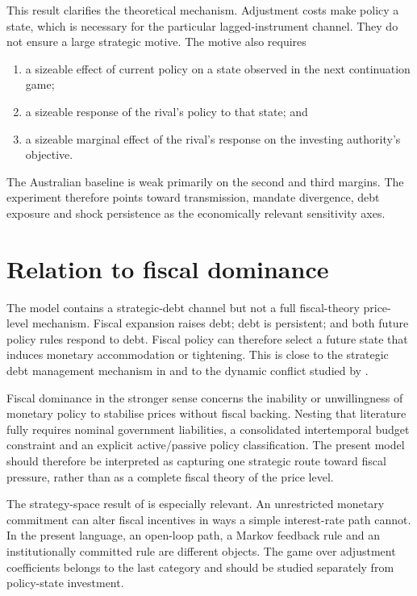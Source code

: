 \documentclass[11pt]{article}
\begin{document}
This result clarifies the theoretical mechanism.  Adjustment costs make policy
a state, which is necessary for the particular lagged-instrument channel.
They do not ensure a large strategic motive.  The motive also requires
\begin{enumerate}
 \item a sizeable effect of current policy on a state observed in the next
       continuation game;
 \item a sizeable response of the rival's policy to that state; and
 \item a sizeable marginal effect of the rival's response on the investing
       authority's objective.
\end{enumerate}
The Australian baseline is weak primarily on the second and third margins.
The experiment therefore points toward transmission, mandate divergence, debt
exposure and shock persistence as the economically relevant sensitivity axes.

\section{Relation to fiscal dominance}

The model contains a strategic-debt channel but not a full fiscal-theory price-
level mechanism.  Fiscal expansion raises debt; debt is persistent; and both
future policy rules respond to debt.  Fiscal policy can therefore select a
future state that induces monetary accommodation or tightening.  This is close
to the strategic debt management mechanism in \citet{BeetsmaBovenberg1997}
and to the dynamic conflict studied by \citet{Tabellini1986}.

Fiscal dominance in the stronger sense concerns the inability or unwillingness
of monetary policy to stabilise prices without fiscal backing.  Nesting that
literature fully requires nominal government liabilities, a consolidated
intertemporal budget constraint and an explicit active/passive policy
classification.  The present model should therefore be interpreted as
capturing one strategic route toward fiscal pressure, rather than as a complete
fiscal theory of the price level.

The strategy-space result of \citet{Gnocchi2013} is especially relevant.  An
unrestricted monetary commitment can alter fiscal incentives in ways a simple
interest-rate path cannot.  In the present language, an open-loop path, a
Markov feedback rule and an institutionally committed rule are different
objects.  The game over adjustment coefficients belongs to the last category
and should be studied separately from policy-state investment.
\end{document}
